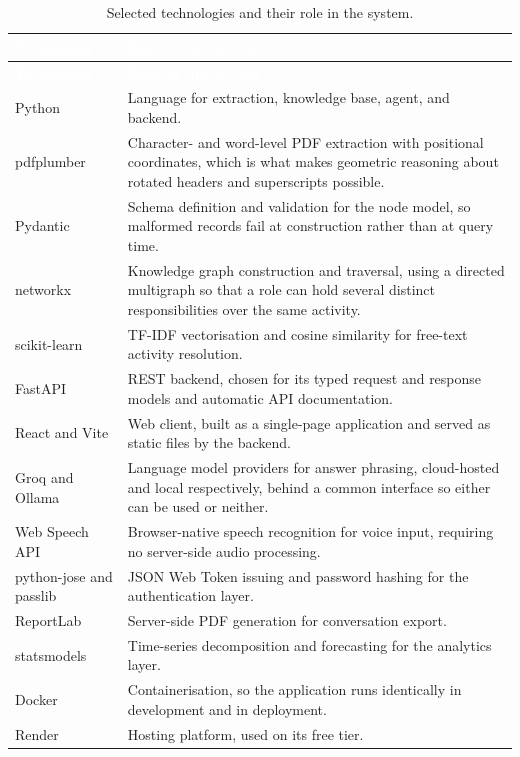 \begin{longtable}{|p{}|p{}|}
\caption{Selected technologies and their role in the system.}\label{tab:tech}\\
\hline
\rowcolor{thesisgreen}\textcolor{white}{\textbf{Technology}} & \textcolor{white}{\textbf{Role in the system}} \\
\hline
\endfirsthead
\hline
\rowcolor{thesisgreen}\textcolor{white}{\textbf{Technology}} & \textcolor{white}{\textbf{Role in the system}} \\
\hline
\endhead
Python & Language for extraction, knowledge base, agent, and backend. \\ \hline
pdfplumber & Character- and word-level PDF extraction with positional coordinates, which is what makes geometric reasoning about rotated headers and superscripts possible. \\ \hline
Pydantic & Schema definition and validation for the node model, so malformed records fail at construction rather than at query time. \\ \hline
networkx & Knowledge graph construction and traversal, using a directed multigraph so that a role can hold several distinct responsibilities over the same activity. \\ \hline
scikit-learn & TF-IDF vectorisation and cosine similarity for free-text activity resolution. \\ \hline
FastAPI & REST backend, chosen for its typed request and response models and automatic API documentation. \\ \hline
React and Vite & Web client, built as a single-page application and served as static files by the backend. \\ \hline
Groq and Ollama & Language model providers for answer phrasing, cloud-hosted and local respectively, behind a common interface so either can be used or neither. \\ \hline
Web Speech API & Browser-native speech recognition for voice input, requiring no server-side audio processing. \\ \hline
python-jose and passlib & JSON Web Token issuing and password hashing for the authentication layer. \\ \hline
ReportLab & Server-side PDF generation for conversation export. \\ \hline
statsmodels & Time-series decomposition and forecasting for the analytics layer. \\ \hline
Docker & Containerisation, so the application runs identically in development and in deployment. \\ \hline
Render & Hosting platform, used on its free tier. \\ \hline
\end{longtable}


